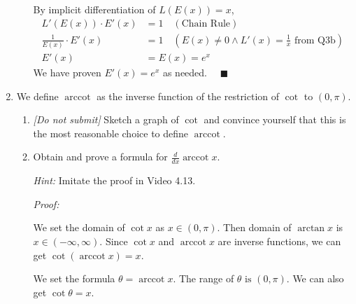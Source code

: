 \documentclass[12pt]{exam}
\newcommand {\DS} [1] {${\displaystyle #1}$}
\newcommand{\vv}{\vspace{.1cm}}
\DeclareMathOperator{\arccot}{arccot}
\begin{document}
\begin{enumerate}
\begin{enumerate}
	    By implicit differentiation of $L(E(x))=x$, 
	    \begin{align*}
	        L'(E(x))\cdot E'(x)&=1\quad(\mbox{Chain Rule})\\
	        \frac{1}{E(x)}\cdot E'(x)&=1\quad(E(x)\neq0 \land L'(x)=\frac{1}{x}\mbox{ from Q3b})\\
	        E'(x)&=E(x)=e^x
	    \end{align*}
	    We have proven $E'(x)=e^x$ as needed. $\quad\blacksquare$
	\end{enumerate}

\vv

\item  We define $\arccot$ as the inverse function of the restriction of $\cot$ to \DS{(0, \pi)}.
	\begin{enumerate}
		\item \emph{[Do not submit]}  Sketch a graph of $\cot$ and convince yourself that this is the most reasonable choice to define $\arccot$.
		\item   Obtain and prove a formula for \DS{\frac{d}{dx} \arccot x}.
		
			\emph{Hint:}  Imitate the proof in Video 4.13.
		
		\vv
		
		\emph{Proof:}
		
		\vv
		
		We set the domain of $\cot x$ as $x\in(0,\pi).$ Then domain of $\arctan x$ is $x\in(-\infty,\infty).$ Since $\cot x$ and $\arccot x$ are inverse functions, we can get $\cot(\arccot x)=x.$
		
		We set the formula $\theta=\arccot{x}$. The range of $\theta \mbox{ is } (0, \pi)$. We can also get $\cot\theta=x$.
		

\end{enumerate}
\end{enumerate}
\end{document}
